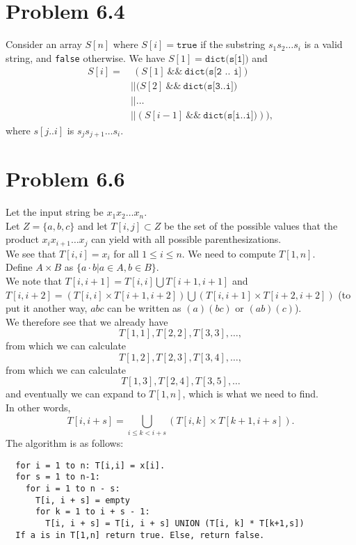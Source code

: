 \documentclass[12pt]{report}
\newcommand{\co}{\texttt}
\renewcommand{\and}{\ \&\& \ }
\begin{document}
\section{Problem 6.4}
Consider an array $S[n]$ where $S[i] = \co{true}$ if the substring $s_1 s_2 \ldots s_i$ is a valid string, and \co{false} otherwise. We have $S[1] = \co{dict(s[1])}$ and 
$$
\begin{aligned}
S[i] = & \ (S[1] \and \co{dict(s[2 .. i]}) \\ 
& || (S[2] \and \co{dict(s[3..i])} \\ 
& || \ldots \\
& || (S[i-1] \and \co{dict(s[i..i])})), 
\end{aligned}$$
where $s[j..i]$ is $s_j s_{j+1} \ldots s_i$.

\section{Problem 6.6}
Let the input string be $x_1 x_2 \ldots x_n$. \\
Let $Z = \{a,b,c\}$ and let $T[i,j] \subset Z$ be the set of the possible values that the product $x_i x_{i+1} \ldots x_{j}$ can yield with all possible parenthesizations. \\
We see that $T[i,i] = x_i$ for all $1 \le i \le n$. We need to compute $T[1,n]$. \\
Define $A \times B$ as $\{ a \cdot b | a \in A, b \in B\}$. \\
We note that $T[i, i+1] = T[i,i] \bigcup T[i+1, i+1]$ and $T[i,i+2] = (T[i,i] \times T[i+1, i+2]) \bigcup (T[i,i+1] \times T[i+2,i+2])$ (to put it another way, $abc$ can be written as $(a)(bc)$ or $(ab)(c)$). \\
We therefore see that we already have $$T[1,1], T[2,2], T[3,3], \ldots,$$
from which we can calculate $$T[1,2], T[2,3], T[3,4], \ldots,$$
from which we can calculate $$T[1,3], T[2,4], T[3,5], \ldots $$
and eventually we can expand to $T[1,n]$, which is what we need to find.\\
In other words, $$T[i, i + s] = \bigcup_{i \le k < i + s} (T[i,k] \times T[k+1, i + s]).$$
The algorithm is as follows:
\begin{lstlisting}
  for i = 1 to n: T[i,i] = x[i].
  for s = 1 to n-1:
    for i = 1 to n - s:
      T[i, i + s] = empty
      for k = 1 to i + s - 1:
        T[i, i + s] = T[i, i + s] UNION (T[i, k] * T[k+1,s])
  If a is in T[1,n] return true. Else, return false.
\end{lstlisting}
\end{document}
